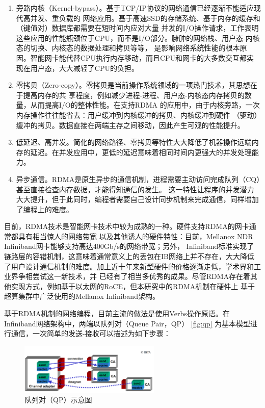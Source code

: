 \begin{enumerate}
	\item 旁路内核（Kernel-bypass）。基于TCP/IP协议的网络通信已经逐渐不能适应现代高并发、重负载的
	网络应用。基于高速SSD的存储系统、基于内存的缓存和（键值对）数据库都需要在短时间内应对大量
	并发的I/O操作请求，工作\cite{mitchell2013using}表明这些应用的性能瓶颈位于CPU，而不是I/O部分。臃肿的网络栈、用户态-内核态的切换、内核态的数据处理和拷贝等等，
	是影响网络系统性能的根本原因。智能网卡能代替CPU执行内存移动，而且CPU和网卡的大多数交互都实现在用户态，大大减轻了CPU的负担。
	\item 零拷贝（Zero-copy）。零拷贝是当前操作系统领域的一项热门技术\cite{taranov2021naos}\cite{chapman2010introducing}，其思想在于提高内存的共
	享程度，例如减少进程-进程、用户态-内核态内存拷贝的数量，从而提高I/O的整体性能。在支持RDMA
	的应用中，由于内核旁路，一次内存操作往往能省去：用户缓冲到内核缓冲的拷贝、内核缓冲到硬件
	（驱动）缓冲的拷贝。数据直接在两端主存之间移动，因此产生可观的性能提升\cite{taranov2021naos}。
	\item 低延迟、高并发。简化的网络路径、零拷贝等特性大大降低了机器操作远端内存的延迟\cite{neugebauer2018understanding}。在并发应用中，更低的延迟意味着相同时间内更强大的并发处理能力。
	\item 异步通信。RDMA是原生异步的通信机制，进程需要主动访问完成队列（CQ）甚至直接检查内存数据，才能得知通信的发生。
	这一特性让程序的并发潜力大大提升，但于此同时，编程者需要自己设计同步机制来完成通信，同样增加了编程上的难度。
\end{enumerate}

目前，RDMA技术是智能网卡技术中较为成熟的一种。硬件支持RDMA的网卡通常都具有相当惊人的网络带宽
以及其他诱人的硬件特性：目前，Mellanox NDR Infiniband网卡能够支持高达400Gb/s的网络带宽；另外，
Infiniband标准实现了链路层的容错机制，这意味着通常意义上的丢包在IB网络上并不存在，大大降低
了用户设计通信机制的难度。加上近十年来新型硬件的价格逐渐走低\cite{mitchell2013using}，学术界和工业界争相尝试这一新技术，并
已经有了相当多优秀的成果。尽管RDMA存在着其他实现方式，例如基于以太网的RoCE，但本研究中的RDMA机制在硬件上
基于超算集群中广泛使用的Mellanox Infiniband架构。

基于RDMA机制的网络编程，目前主流的做法是使用Verbs操作原语\cite{pfister2001introduction}。在Infiniband网络架构中，两端以队列对（Queue Pair，QP）
\autoref{fig:qp}\cite{pfister2001introduction}
为基本模型进行通信，一次简单的发送-接收可以描述为如下步骤：

\begin{figure}[h]
	\centering
	\includegraphics[width=0.6\textwidth]{image/chap01/qp.png}
	\caption{队列对（QP）示意图}
	\label{fig:qp}
\end{figure}

